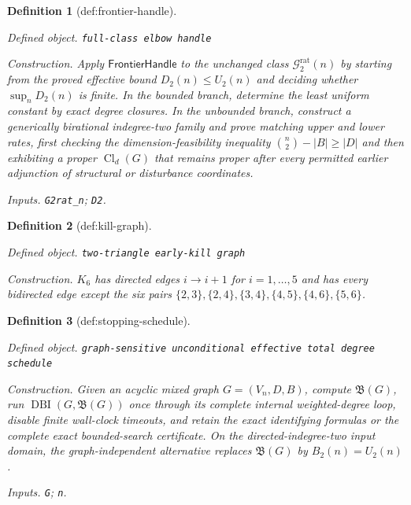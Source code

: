 \documentclass{article}
\newtheorem{definition}{Definition}
\begin{document}
\begin{definition}[def:frontier-handle]\label{def:frontier-handle}
\par\smallskip\noindent\emph{Defined object.} \texttt{full-\allowbreak{}class elbow handle}
\par\smallskip\noindent\emph{Construction.} Apply \(\mathsf{FrontierHandle}\) to the unchanged class \(\mathcal G_{2}^{\mathrm{rat}}(n)\) by starting from the proved effective bound \(D_2(n)\leq U_2(n)\) and deciding whether \(\sup_nD_2(n)\) is finite.  In the bounded branch, determine the least uniform constant by exact degree closures.  In the unbounded branch, construct a generically birational indegree-two family and prove matching upper and lower rates, first checking the dimension-feasibility inequality \(\binom n2-|B|\geq|D|\) and then exhibiting a proper \(\operatorname{Cl}_d(G)\) that remains proper after every permitted earlier adjunction of structural or disturbance coordinates.
\par\smallskip\noindent\emph{Inputs.} \texttt{G2rat\_\allowbreak{}n}; \texttt{D2}.
\end{definition}

\begin{definition}[def:kill-graph]\label{def:kill-graph}
\par\smallskip\noindent\emph{Defined object.} \texttt{two-\allowbreak{}triangle early-\allowbreak{}kill graph}
\par\smallskip\noindent\emph{Construction.} \(K_6\) has directed edges \(i\to i+1\) for \(i=1,\ldots,5\) and has every bidirected edge except the six pairs \(\{2,3\},\{2,4\},\{3,4\},\{4,5\},\{4,6\},\{5,6\}\).
\end{definition}

\begin{definition}[def:stopping-schedule]\label{def:stopping-schedule}
\par\smallskip\noindent\emph{Defined object.} \texttt{graph-\allowbreak{}sensitive unconditional effective total degree schedule}
\par\smallskip\noindent\emph{Construction.} Given an acyclic mixed graph \(G=(V_n,D,B)\), compute \(\mathfrak B(G)\), run \(\operatorname{DBI}(G,\mathfrak B(G))\) once through its complete internal weighted-degree loop, disable finite wall-clock timeouts, and retain the exact identifying formulas or the complete exact bounded-search certificate.  On the directed-indegree-two input domain, the graph-independent alternative replaces \(\mathfrak B(G)\) by \(B_2(n)=U_2(n)\).
\par\smallskip\noindent\emph{Inputs.} \texttt{G}; \texttt{n}.
\end{definition}
\end{document}
